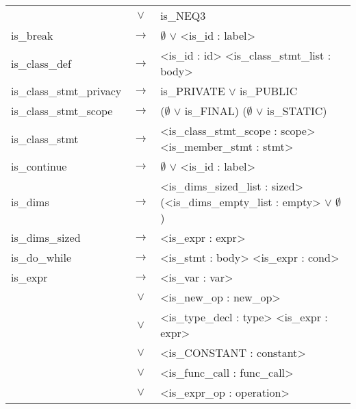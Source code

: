 \documentclass[a4paper]{article}
\begin{document}
\begin{tabular}{lcl}
								& $\vee$ & is\_NEQ3 \\
	is\_break 					& $\to$ & $\emptyset$ $\vee$ <is\_id : label> \\
	is\_class\_def				& $\to$ & <is\_id : id> <is\_class\_stmt\_list : body> \\
	is\_class\_stmt\_privacy	& $\to$ & is\_PRIVATE $\vee$ is\_PUBLIC\\	
	is\_class\_stmt\_scope		& $\to$ &($\emptyset$ $\vee$ is\_FINAL) ($\emptyset$ $\vee$ is\_STATIC) \\
	is\_class\_stmt 			& $\to$ & <is\_class\_stmt\_scope : scope> <is\_member\_stmt : stmt> \\
	is\_continue				& $\to$ & $\emptyset$ $\vee$ <is\_id : label> \\
	is\_dims					& $\to$ & <is\_dims\_sized\_list : sized> (<is\_dims\_empty\_list : empty> $\vee$ $\emptyset$) \\
	is\_dims\_sized				& $\to$ & <is\_expr : expr> \\
	is\_do\_while				& $\to$ & <is\_stmt : body> <is\_expr : cond> \\
	is\_expr					& $\to$ & <is\_var : var> \\
								& $\vee$ & <is\_new\_op : new\_op> \\
								& $\vee$ & <is\_type\_decl : type> <is\_expr : expr>\\
								& $\vee$ & <is\_CONSTANT : constant> \\
								& $\vee$ & <is\_func\_call : func\_call> \\
								& $\vee$ & <is\_expr\_op : operation> \\


\end{tabular}
\end{document}
